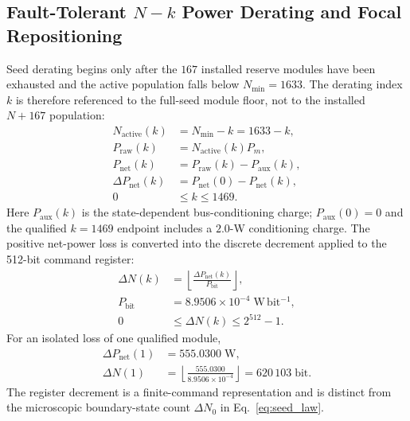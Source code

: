 \documentclass[10pt,twocolumn]{IEEEtran}
\begin{document}
\subsection{Fault-Tolerant $N-k$ Power Derating and Focal Repositioning}
\label{sec:power_derating}

Seed derating begins only after the $167$ installed reserve modules have
been exhausted and the active population falls below
$N_{\min}=1633$.  The derating index $k$ is therefore referenced to the
full-seed module floor, not to the installed $N+167$ population:
\begin{equation}
\begin{aligned}
N_{\mathrm{active}}(k)&=N_{\min}-k=1633-k, \\
P_{\mathrm{raw}}(k)&=N_{\mathrm{active}}(k)P_m, \\
P_{\mathrm{net}}(k)&=P_{\mathrm{raw}}(k)-P_{\mathrm{aux}}(k), \\
\Delta P_{\mathrm{net}}(k)
&=P_{\mathrm{net}}(0)-P_{\mathrm{net}}(k), \\
0&\leq k\leq1469.
\end{aligned}
\label{eq:n_minus_k_power}
\end{equation}
Here $P_{\mathrm{aux}}(k)$ is the state-dependent bus-conditioning charge;
$P_{\mathrm{aux}}(0)=0$ and the qualified $k=1469$ endpoint includes a
$2.0$-W conditioning charge.  The positive net-power loss is converted into
the discrete decrement applied to the 512-bit command register:
\begin{equation}
\begin{aligned}
\Delta N(k)
&=\left\lfloor
\frac{\Delta P_{\mathrm{net}}(k)}{P_{\mathrm{bit}}}
\right\rfloor, \\
P_{\mathrm{bit}}&=8.9506\times10^{-4}
\;\mathrm{W\,bit^{-1}}, \\
0&\leq\Delta N(k)\leq2^{512}-1.
\end{aligned}
\label{eq:hardware_bit_decrement}
\end{equation}
For an isolated loss of one qualified module,
\begin{equation}
\begin{aligned}
\Delta P_{\mathrm{net}}(1)&=555.0300\;\mathrm{W}, \\
\Delta N(1)
&=\left\lfloor
\frac{555.0300}{8.9506\times10^{-4}}
\right\rfloor
=620\,103\;\mathrm{bit}.
\end{aligned}
\label{eq:single_module_bit_decrement}
\end{equation}
The register decrement is a finite-command representation and is distinct
from the microscopic boundary-state count $\Delta N_0$ in
Eq.~\eqref{eq:seed_law}.
\end{document}
